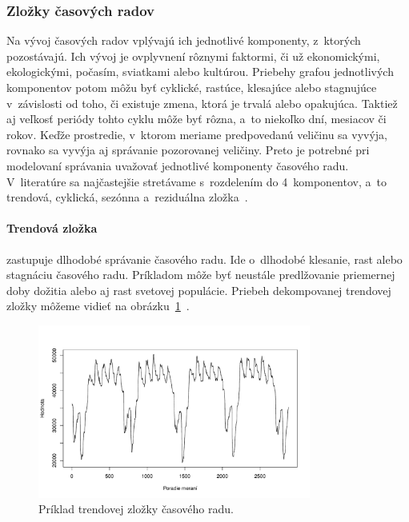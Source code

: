 \documentclass[a4paper,twoside,slovak,12pt,appendix]{article}
\begin{document}

\subsubsection{Zložky časových radov}
Na vývoj časových radov vplývajú ich jednotlivé komponenty, z~ktorých
pozostávajú. Ich vývoj je ovplyvnení rôznymi faktormi, či už ekonomickými,
ekologickými, počasím, sviatkami alebo kultúrou. Priebehy grafou jednotlivých
komponentov potom môžu byť cyklické, rastúce, klesajúce alebo stagnujúce
v~závislosti od toho, či existuje zmena, ktorá je trvalá alebo opakujúca.
Taktiež aj veľkosť periódy tohto cyklu môže byť rôzna, a~to niekoľko dní,
mesiacov či rokov. Keďže prostredie, v~ktorom meriame predpovedanú veličinu sa
vyvýja, rovnako sa vyvýja aj správanie pozorovanej veličiny. Preto je potrebné
pri modelovaní správania uvažovať jednotlivé komponenty časového radu.
V~literatúre sa najčastejšie stretávame s~rozdelením do 4~komponentov, a~to
trendová, cyklická, sezónna a~reziduálna zložka~\cite{Grmanova2016}.

\paragraph{Trendová zložka} zastupuje dlhodobé správanie časového radu. Ide
o~dlhodobé klesanie, rast alebo stagnáciu časového radu. Príkladom môže byť
neustále predlžovanie priemernej doby dožitia alebo aj rast svetovej populácie.
Priebeh dekompovanej trendovej zložky môžeme vidieť na
obrázku~\ref{fig:trend-component}~\cite{Agrawal2013}.

\begin{figure}[]
  \centering
  \includegraphics[width=0.8\textwidth]{trend_component.pdf}
  \caption{Príklad trendovej zložky časového radu.}
  \label{fig:trend-component}
\end{figure}
\end{document}
